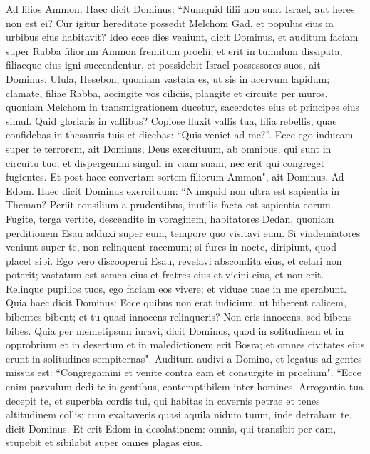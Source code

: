 \begin{biblechapter}  
\verse Ad filios Ammon. Haec dicit Dominus: “Numquid filii non sunt Israel, aut heres non est ei? Cur igitur hereditate possedit Melchom Gad, et populus eius in urbibus eius habitavit? 
\verse Ideo ecce dies veniunt, dicit Dominus, et auditum faciam super Rabba filiorum Ammon fremitum proelii; et erit in tumulum dissipata, filiaeque eius igni succendentur, et possidebit Israel possessores suos, ait Dominus. 
\verse Ulula, Hesebon, quoniam vastata es, ut sis in acervum lapidum; clamate, filiae Rabba, accingite vos ciliciis, plangite et circuite per muros, quoniam Melchom in transmigrationem ducetur, sacerdotes eius et principes eius simul. 
\verse Quid gloriaris in vallibus? Copiose fluxit vallis tua, filia rebellis, quae confidebas in thesauris tuis et dicebas: “Quis veniet ad me?”. 
\verse Ecce ego inducam super te terrorem, ait Dominus, Deus exercituum, ab omnibus, qui sunt in circuitu tuo; et dispergemini singuli in viam suam, nec erit qui congreget fugientes. 
\verse Et post haec convertam sortem filiorum Ammon", ait Dominus. 
\verse Ad Edom. Haec dicit Dominus exercituum: “Numquid non ultra est sapientia in Theman? Periit consilium a prudentibus, inutilis facta est sapientia eorum. 
\verse Fugite, terga vertite, descendite in voraginem, habitatores Dedan, quoniam perditionem Esau adduxi super eum, tempore quo visitavi eum. 
\verse Si vindemiatores veniunt super te, non relinquent racemum; si fures in nocte, diripiunt, quod placet sibi. 
\verse Ego vero discooperui Esau, revelavi abscondita eius, et celari non poterit; vastatum est semen eius et fratres eius et vicini eius, et non erit. 
\verse Relinque pupillos tuos, ego faciam eos vivere; et viduae tuae in me sperabunt. 
\verse Quia haec dicit Dominus: Ecce quibus non erat iudicium, ut biberent calicem, bibentes bibent; et tu quasi innocens relinqueris? Non eris innocens, sed bibens bibes. 
\verse Quia per memetipsum iuravi, dicit Dominus, quod in solitudinem et in opprobrium et in desertum et in maledictionem erit Bosra; et omnes civitates eius erunt in solitudines sempiternas". 
\verse Auditum audivi a Domino, et legatus ad gentes missus est: “Congregamini et venite contra eam et consurgite in proelium". 
\verse “Ecce enim parvulum dedi te in gentibus, contemptibilem inter homines. 
\verse Arrogantia tua decepit te, et superbia cordis tui, qui habitas in cavernis petrae et tenes altitudinem collis; cum exaltaveris quasi aquila nidum tuum, inde detraham te, dicit Dominus. 
\verse Et erit Edom in desolationem: omnis, qui transibit per eam, stupebit et sibilabit super omnes plagas eius. 

\end{biblechapter}
